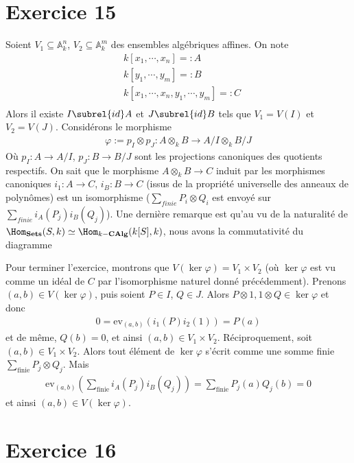     \section{Exercice 15}
        Soient $V_1 \subseteq \mathbb{A}_k^n$, $V_2 \subseteq \mathbb{A}_k^m$ des ensembles algébriques affines. On note
        \begin{align*}
            &k[x_1, \cdots, x_n] =: A \\
            &k[y_1, \cdots, y_m] =: B \\
            &k[x_1, \cdots, x_n, y_1, \cdots, y_m] =: C \\
        \end{align*}
        Alors il existe $I \subrel{id} A$ et $J \subrel{id} B$ tels que $V_1 = V(I)$ et $V_2 = V(J)$. Considérons le morphisme
        \begin{align}
            \varphi := p_I \otimes p_J : A \otimes_k B \to A/I \otimes_k B/J
        \end{align}
        Où $p_I : A \to A/I$, $p_J : B \to B/J$ sont les projections canoniques des quotients respectifs. On sait que le morphisme $A \otimes_k B \to C$ induit par les morphismes canoniques $i_1 : A \to C$, $i_B : B \to C$ (issus de la propriété universelle des anneaux de polynômes) est un isomorphisme ($\sum_{finie} P_i \otimes Q_i$ est envoyé sur $\sum_{finie} i_A(P_j)i_B(Q_j)$). Une dernière remarque est qu'au vu de la naturalité de $\Hom_{\mathbf{Sets}}(S,k) \simeq \Hom_{k-\mathbf{CAlg}}(k[S],k)$, nous avons la commutativité du diagramme
        \begin{figure}[H]
            \centering
        \end{figure} \noindent
        Pour terminer l'exercice, montrons que $V(\ker \varphi) = V_1 \times V_2$ (où $\ker \varphi$ est vu comme un idéal de $C$ par l'isomorphisme naturel donné précédemment). Prenons $(a,b) \in V(\ker \varphi)$, puis soient $P \in I$, $Q \in J$. Alors $P \otimes 1, 1 \otimes Q \in \ker \varphi$ et donc
        \begin{align*}
            0 = \mathrm{ev}_{(a,b)}(i_1(P)i_2(1)) =  P(a)
        \end{align*}
        et de même, $Q(b) = 0$, et ainsi $(a,b) \in V_1 \times V_2$. Réciproquement, soit $(a,b) \in V_1 \times V_2$. Alors tout élément de $\ker \varphi$ s'écrit comme une somme finie $\sum_{\mathrm{\mathrm{finie}}} P_j \otimes Q_j$. Mais
        \begin{align*}
            \mathrm{ev}_{(a,b)}\left(\sum_{\mathrm{finie}} i_A(P_j)i_B(Q_j)\right) = \sum_{\mathrm{finie}} P_j(a)Q_j(b) = 0
        \end{align*}
        et ainsi $(a,b) \in V(\ker \varphi)$.

    \section{Exercice 16}
        